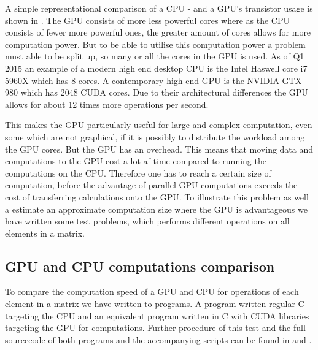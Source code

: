 A simple representational comparison of a CPU - and a GPU's transistor usage is shown in .
The GPU consists of more less powerful cores where as the CPU consists of fewer more powerful ones, the greater amount of cores allows for more computation power.
But to be able to utilise this computation power a problem must able to be split up, so many or all the cores in the GPU is used.
As of Q1 2015 an example of a modern high end desktop CPU is the Intel Haswell core i7 5960X which has 8 cores. \citep{puget}
A contemporary high end GPU is the NVIDIA GTX 980 which has 2048 CUDA cores. \citep{techpowerup,gtx980}
Due to their architectural differences the GPU allows for about 12 times more operations per second.

This makes the GPU particularly useful for large and complex computation, even some which are not graphical, if it is possibly to distribute the workload among the GPU cores.
But the GPU has an overhead.
This means that moving data and computations to the GPU cost a lot af time compared to running the computations on the CPU.
Therefore one has to reach a certain size of computation, before the advantage of parallel GPU computations exceeds the cost of transferring calculations onto the GPU.
To illustrate this problem as well a estimate an approximate computation size where the GPU is advantageous we have written some test problems, which performs different operations on all elements in a matrix. 

\subsection{GPU and CPU computations comparison}
To compare the computation speed of a GPU and CPU for operations of each element in a matrix we have written to programs.
A program written regular C targeting the CPU and an equivalent program written in C with CUDA libraries targeting the GPU for computations.
Further procedure of this test and the full sourcecode of both programs and the accompanying scripts can be found in  and .

